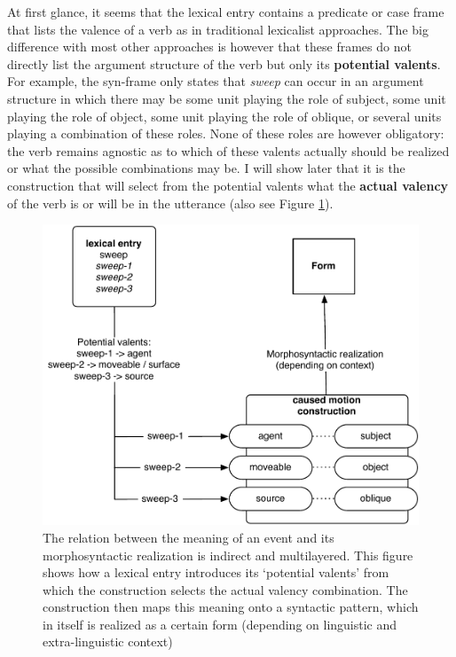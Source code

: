 At first glance, it seems that the lexical entry contains a predicate or case frame that lists the valence of a verb as in traditional lexicalist approaches. The big difference with most other approaches is however that these frames do not directly list the argument structure of the verb but only its {\bfseries potential valents}. For example, the syn-frame only states that {\em sweep} can occur in an argument structure in which there may be some unit playing the role of subject, some unit playing the role of object, some unit playing the role of oblique, or several units playing a combination of these roles. None of these roles are however obligatory: the verb remains agnostic as to which of these valents actually should be realized or what the possible combinations may be. I will show later that it is the construction that will select from the potential valents what the {\bfseries actual valency} of the verb is or will be in the utterance (also see Figure \ref{f:sweep-quadrant}).

\begin{figure}[t]
\centerline{\includegraphics[width=0.8\linewidth]{Chapter2/figs/quadrant}}
 \caption[Integrating {\em sweep} with the Caused-Motion Construction]{The relation between the meaning of an event and its morphosyntactic realization is indirect and multilayered. This figure shows how a lexical entry introduces its `potential valents' from which the construction selects the actual valency combination. The construction then maps this meaning onto a syntactic pattern, which in itself is realized as a certain form (depending on linguistic and extra-linguistic context)}
   \label{f:sweep-quadrant}
\end{figure}

